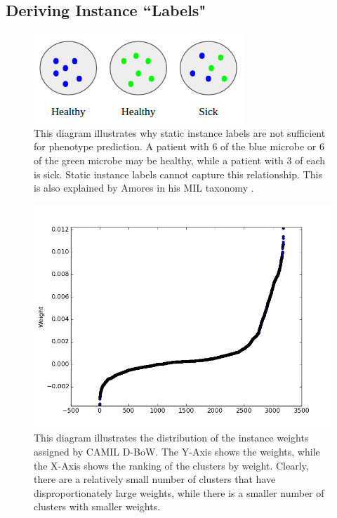 \subsection{Deriving Instance ``Labels"}

\begin{figure}[t]
\centering
\includegraphics[scale=0.5]{./instance-labels.png}
\caption{This diagram illustrates why static instance labels are not sufficient for phenotype prediction. A patient with 6 of the blue microbe or 6 of the green microbe may be healthy, while a patient with 3 of each is sick. Static instance labels cannot capture this relationship. This is also explained by Amores in his MIL taxonomy \cite{amores13}.} \label{instance-labels}
\end{figure}

\begin{figure}[h]
\centering
\includegraphics[scale=0.4]{./instance-scatter.png}
\caption{This diagram illustrates the distribution of the instance weights assigned by CAMIL D-BoW. The Y-Axis shows the weights, while the X-Axis shows the ranking of the clusters by weight. Clearly, there are a relatively small number of clusters that have disproportionately large weights, while there is a smaller number of clusters with smaller weights.} \label{instance-scatter}
\end{figure}

